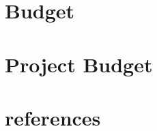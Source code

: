 \documentclass{article}
\begin{document}
  \newpage{}
  \section{Budget}

  \newpage{}
  \section{Project Budget}

  \section{references}


   
\end{document}

